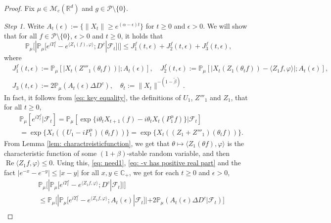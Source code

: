 \documentclass[EJP]{ejpecp} %
\begin{document}
\begin{proof}
  Fix  $\mu \in \mathcal M_c(\mathbb R^d)$ and $g \in \mathcal P\setminus \{0\}$.

  \emph{Step 1.} Write $ A_t(\epsilon) :=\{ \|X_t\| \geq e^{(\alpha - \epsilon)t} \} $ for $t\geq 0$ and $\epsilon > 0$.
  We will show that for all $f\in \mathcal P \setminus \{0\}$, $\epsilon > 0$ and $t\geq 0$, it holds that
  \[
    \mathbb P_\mu \Big[ | \mathbb P_\mu [e^{i\Upsilon^f_t} - e^{\langle Z_1(f), \varphi\rangle}; D^c | \mathscr F_t ]| \Big]
    \leq J^f_1(t,\epsilon)+J^f_2(t,\epsilon)+J^f_3(t,\epsilon),
  \]
where
\begin{align}
\label{eq: Def of Ji}
  &J^f_1(t,\epsilon):= \mathbb{P}_{\mu} [ | X_t(Z'''_1(\theta_t f)) |; A_t(\epsilon) ],
 \quad
  J^f_2(t,\epsilon):= \mathbb{P}_{\mu}[|X_t( Z_1(\theta_t f))-\langle Z_1f, \varphi\rangle |; A_t(\epsilon)],
  \\ & J_3(t,\epsilon):=2\mathbb{P}_{\mu}(A_t (\epsilon)\Delta D^c),
 \quad
   \theta_t := \|X_t\|^{-(1 - \tilde \beta)}.
\end{align}
In fact, it follows from \eqref{eq: key equality}, the definitions of $U_1$, $Z'''_1$ and $Z_1$, that for all $t\geq 0$,
\begin{align}
  \label{eq: need1}
  & \mathbb{P}_{\mu}[e^{i\Upsilon^f_t}|\mathscr{F}_t]
    = \mathbb{P}_{\mu}[\exp\{i\theta_t X_{t+1} (f) - i \theta_t X_t(P_1^\alpha f)\} |\mathscr{F}_{t}] \\
  & = \exp\{X_t((U_1 - iP^\alpha_1 ) (\theta_t f))\}
    = \exp\{X_t((Z_1 + Z'''_1) (\theta_t f))\}.
\end{align}
From Lemma \ref{lem: charactreisticfunction}, we  get that $\theta\mapsto \langle Z_1(\theta f),\varphi\rangle$ is the characteristic function of some $(1+\beta)$-stable random variable, and then  $\operatorname{Re} \langle Z_1f, \varphi\rangle \leq 0$.
Using this, \eqref{eq: need1}, \eqref{eq: -v has positive real part} and the fact $|e^{-x} - e^{-y}| \leq |x-y|$ for all $x,y \in \mathbb C_+$, we get for each $t\geq 0$ and $\epsilon> 0$,
\begin{align}
  \label{eq: inequality that will used later}
  & \mathbb{P}_\mu \Big[ |  \mathbb{P}_\mu [ e^{i\Upsilon^f_t} - e^{\langle Z_1f,\varphi \rangle} ; D^c | \mathscr F_{t}]   |\Big]  \\
  &  \leq \mathbb{P}_\mu   \Big[ |    \mathbb{P}_\mu [ e^{i \Upsilon^f_t }-e^{\langle Z_1f, \varphi\rangle}; A_{t}(\epsilon) | \mathscr F_{t}] |  + 2\mathbb P_\mu ( A_{t}(\epsilon) \Delta D^c | \mathscr F_{t}) \Big] \\

\end{align}
\end{proof}
\end{document}
